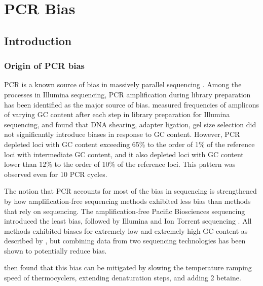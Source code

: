 \documentclass[parskip=full, numbers=noenddot]{scrreprt}
\begin{document}
\chapter{PCR Bias}
\label{ch:pcrbias}

\section{Introduction}
\label{sec:pcrbias_intro}

\subsection{Origin of PCR bias}
\label{ssec:pcrbias_intro_origin}


PCR is a known source of bias in massively parallel sequencing \citep{olova_comparison_2018}.  Among the processes in Illumina sequencing, PCR amplification during library preparation has been identified as the major source of bias.
\citet{aird_analyzing_2011} measured frequencies of amplicons of varying GC content after each step in library preparation for Illumina sequencing, and found that DNA shearing, adapter ligation, gel size selection did not significantly introduce biases in response to GC content.  However, PCR depleted loci with GC content exceeding 65\% to the order of 1\% of the reference loci with intermediate GC content, and it also depleted loci with GC content lower than 12\% to the order of 10\% of the reference loci.  This pattern was observed even for 10 PCR cycles.

The notion that PCR accounts for most of the bias in sequencing is strengthened by how amplification-free sequencing methods exhibited less bias than methods that rely on sequencing.  The amplification-free Pacific Biosciences sequencing introduced the least bias, followed by Illumina and Ion Torrent sequencing \citep{ross_characterizing_2013}. All methods exhibited biases for extremely low and extremely high GC content as described by \citet{aird_analyzing_2011}, but combining data from two sequencing technologies has been shown to potentially reduce bias.

\citet{aird_analyzing_2011} then found that this bias can be mitigated by slowing the temperature ramping speed of thermocyclers, extending denaturation steps, and adding \SI{2}{\Molar} betaine.
\end{document}
